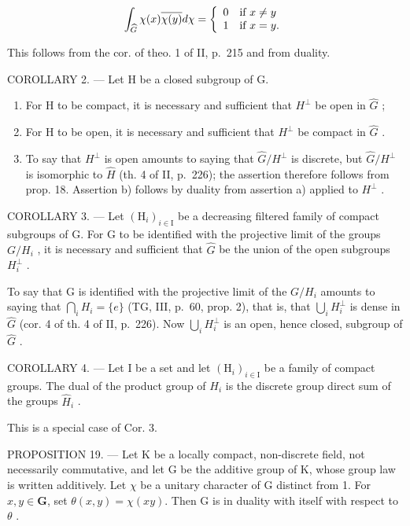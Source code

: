 \[
\int_ {\widehat {G}} \chi (x) \overline {{\chi (y)}} d \chi = \left\{ \begin{array}{l l} 0 & \text{if } x \neq y \\ 1 & \text{if } x = y. \end{array} \right.
\]

This follows from the cor. of theo. 1 of II, p.~215 and from duality.

COROLLARY 2. --- Let H be a closed subgroup of G.

\begin{enumerate}
\def\labelenumi{\alph{enumi})}
\item
  For H to be compact, it is necessary and sufficient that \(H^{\perp}\) be open in \(\widehat{G}\) ;
\item
  For H to be open, it is necessary and sufficient that \(H^{\perp}\) be compact in \(\widehat{G}\) .
\item
  To say that \(H^{\perp}\) is open amounts to saying that \(\widehat{G}/H^{\perp}\) is discrete, but \(\widehat{G}/H^{\perp}\) is isomorphic to \(\widehat{H}\) (th. 4 of II, p.~226); the assertion therefore follows from prop. 18. Assertion b) follows by duality from assertion a) applied to \(H^{\perp}\) .
\end{enumerate}

COROLLARY 3. --- Let \((\mathrm{H}_{i})_{i\in\mathrm{I}}\) be a decreasing filtered family of compact subgroups of G. For G to be identified with the projective limit of the groups \(G/H_{i}\) , it is necessary and sufficient that \(\hat{G}\) be the union of the open subgroups \(H_{i}^{\perp}\) .

To say that G is identified with the projective limit of the \(G/H_{i}\) amounts to saying that \(\bigcap_{i}H_{i}=\{e\}\) (TG, III, p.~60, prop. 2), that is, that \(\bigcup_{i}H_{i}^{\perp}\) is dense in \(\widehat{G}\) (cor. 4 of th. 4 of II, p.~226). Now \(\bigcup_{i}H_{i}^{\perp}\) is an open, hence closed, subgroup of \(\widehat{G}\) .

COROLLARY 4. --- Let I be a set and let \((\mathrm{H}_{i})_{i\in\mathrm{I}}\) be a family of compact groups. The dual of the product group of \(H_{i}\) is the discrete group direct sum of the groups \(\widehat{H}_{i}\) .

This is a special case of Cor. 3.

PROPOSITION 19. --- Let K be a locally compact, non-discrete field, not necessarily commutative, and let G be the additive group of K, whose group law is written additively. Let \(\chi\) be a unitary character of G distinct from 1. For \(x,y\in\mathbf{G}\), set \(\theta(x,y)=\chi(xy)\). Then G is in duality with itself with respect to \(\theta\) .

